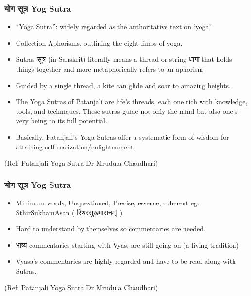 \begin{frame}[fragile]\frametitle{ योग सूत्र Yog Sutra}

	\begin{itemize}\item ``Yoga Sutra'': widely regarded as the authoritative text on `yoga'
	\item Collection Aphorisms, outlining the eight limbs of yoga.
	\item Sutras सूत्र (in Sanskrit) literally means a thread or string धागा that holds things together and more metaphorically refers to an aphorism	
	\item Guided by a single thread, a kite can glide and soar to amazing heights. 
	\item 	The Yoga Sutras of Patanjali are life’s threads, each one rich with knowledge, tools, and techniques. These sutras guide not only the mind but also one’s very being to its full potential. 
	\item 	Basically, Patanjali’s Yoga Sutras offer a systematic form of wisdom for attaining self-realization/enlightenment.
	\end{itemize}

\tiny{(Ref: Patanjali Yoga Sutra Dr Mrudula Chaudhari)}

\end{frame}


\begin{frame}[fragile]\frametitle{ योग सूत्र Yog Sutra}

	\begin{itemize}
	\item Minimum words, Unquestioned, Precise, essence, coherent eg. SthirSukhamAsan ( स्थिरसुखमासनम्| )
	\item Hard to understand by themselves so commentaries are needed.
	\item भाष्य commentaries starting with Vyas, are still going on (a living tradition)
	\item Vyasa's commentaries are highly regarded and have to be read along with Sutras.
	\end{itemize}

\tiny{(Ref: Patanjali Yoga Sutra Dr Mrudula Chaudhari)}

\end{frame}



